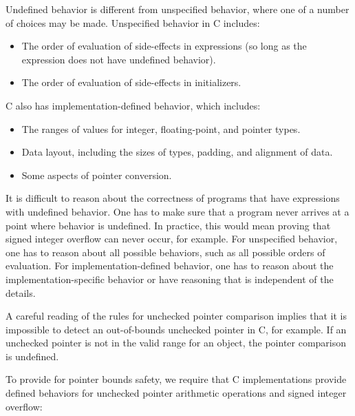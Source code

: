 Undefined behavior is different from unspecified behavior, where one of
a number of choices may be made. Unspecified behavior in C includes:

\begin{itemize}
\item
  The order of evaluation of side-effects in expressions (so long as the
  expression does not have undefined behavior).
\item
  The order of evaluation of side-effects in initializers.
\end{itemize}

C also has implementation-defined behavior, which includes:

\begin{itemize}
\item
  The ranges of values for integer, floating-point, and pointer types.
\item
  Data layout, including the sizes of types, padding, and alignment of
  data.
\item
  Some aspects of pointer conversion.
\end{itemize}

It is difficult to reason about the correctness of programs that have
expressions with undefined behavior. One has to make sure that a program
never arrives at a point where behavior is undefined. In practice, this
would mean proving that signed integer overflow can never occur, for
example. For unspecified behavior, one has to reason about all possible
behaviors, such as all possible orders of evaluation. For
implementation-defined behavior, one has to reason about the
implementation-specific behavior or have reasoning that is independent
of the details.

A careful reading of the rules for unchecked pointer comparison implies
that it is impossible to detect an out-of-bounds unchecked pointer in C,
for example. If an unchecked pointer  is not in the valid range for an
object, the pointer comparison is undefined.

To provide for pointer bounds safety, we require that C implementations
provide defined behaviors for unchecked pointer arithmetic operations and
signed integer overflow:

